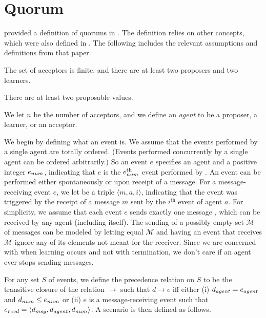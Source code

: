 \section{Quorum}
\citeauthor{Lamport06} provided a definition of quorums in \cite{Lamport06}.
The definition relies on other concepts, which were also defined in \cite{Lamport06}.
The following includes the relevant assumptions and definitions from that paper.

\begin{assumption}[Agent]
    The set of acceptors is finite, and there are at least two proposers and two learners.
\end{assumption}

\begin{assumption}[Value]
    There are at least two proposable values.
\end{assumption}

We let $n$ be the number of acceptors, and we define an \emph{agent} to be a proposer, a learner, or an acceptor.


We begin by defining what an event is.
We assume that the events performed by a single agent are totally ordered.
(Events performed concurrently by a single agent can be ordered arbitrarily.)
So an event $e$ specifies an agent  and a positive integer $e_{num}$, indicating that $e$ is the $e_{num}^{\text{th}}$ event performed by .
An event can be performed either spontaneously or upon receipt of a message.
For a message-receiving event $e$, we let  be a triple $\langle m, a, i \rangle$, indicating that the event was triggered by the receipt of a message $m$ sent by the $i^{\text{th}}$ event of agent $a$.
For simplicity, we assume that each event $e$ sends exactly one message , which can be received by any agent (including itself).
The sending of a possibly empty set $\mathcal{M}$ of messages can be modeled by letting  equal $\mathcal{M}$ and having an event that receives $\mathcal{M}$ ignore any of its elements not meant for the receiver.
Since we are concerned with when learning occurs and not with termination, we don't care if an agent ever stops sending messages.

For any set $S$ of events, we define the precedence relation \preceqS on $S$ to be the transitive closure of the relation $\to$ such that $d \to e$ iff either (i) $d_{agent} = e_{agent}$ and $d_{num} \leq e_{num}$ or (ii) $e$ is a message-receiving event such that $e_{rcvd} = \langle d_{msg}, d_{agent}, d_{num} \rangle$.
A scenario is then defined as follows.

